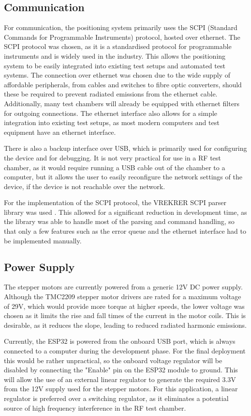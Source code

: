 \subsection{Communication}
For communication, the positioning system primarily uses the SCPI (Standard Commands for Programmable Instruments) protocol, hosted over ethernet. The SCPI protocol was chosen, as it is a standardised protocol for programmable instruments and is widely used in the industry. This allows the positioning system to be easily integrated into existing test setups and automated test systems. The connection over ethernet was chosen due to the wide supply of affordable peripherals, from cables and switches to fibre optic converters, should these be required to prevent radiated emissions from the ethernet cable. Additionally, many test chambers will already be equipped with ethernet filters for outgoing connections. The ethernet interface also allows for a simple integration into existing test setups, as most modern computers and test equipment have an ethernet interface.

There is also a backup interface over USB, which is primarily used for configuring the device and for debugging. It is not very practical for use in a RF test chamber, as it would require running a USB cable out of the chamber to a computer, but it allows the user to easily reconfigure the network settings of the device, if the device is not reachable over the network.

For the implementation of the SCPI protocol, the VREKRER SCPI parser library was used \cite{chavez_vrekrervrekrer_scpi_parser_2025}. This allowed for a significant reduction in development time, as the library was able to handle most of the parsing and command handling, so that only a few features such as the error queue and the ethernet interface had to be implemented manually. 

\subsection{Power Supply}
The stepper motors are currently powered from a generic 12V DC power supply. Although the TMC2209 stepper motor drivers are rated for a maximum voltage of 29V, which would provide more torque at higher speeds, the lower voltage was chosen as it limits the rise and fall times of the current in the motor coils. This is desirable, as it reduces the slope, leading to reduced radiated harmonic emissions.

Currently, the ESP32 is powered from the onboard USB port, which is always connected to a computer during the development phase. For the final deployment this would be rather unpractical, so the onboard voltage regulator will be disabled by connecting the "Enable" pin on the ESP32 module to ground. This will allow the use of an external linear regulator to generate the required 3.3V from the 12V supply used for the stepper motors. For this application, a linear regulator is preferred over a switching regulator, as it eliminates a potential source of high frequency interference in the RF test chamber. 


